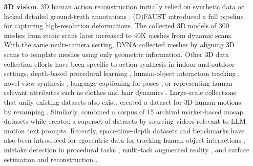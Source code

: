 \noindent
\textbf{3D vision}. 3D human action reconstruction initially relied on synthetic data  or lacked detailed ground-truth annotations . (D)FAUST  introduced a full pipeline for capturing high-resolution deformations. The collected 3D models of 300 meshes from static scans later increased to 40K meshes from dynamic scans. With the same multi-camera setting, DYNA  collected meshes by aligning 3D scans to template meshes using only geometric information. Other 3D data collection efforts have been specific to action synthesis in indoor  and outdoor  settings, depth-based procedural learning , human-object interaction tracking , novel view synthesis , language captioning for poses , or representing human-relevant attributes such as clothes and hair dynamics . Large-scale collections that unify existing datasets also exist.  created a dataset for 3D human motions by revamping . Similarly,   combined a corpus of 15 archival marker-based mocap datasets while  created a superset of datasets by sourcing videos  relevant to LLM motion text prompts. Recently, space-time-depth datasets and benchmarks have also been introduced for egocentric data for tracking human-object interactions , mistake detection in procedural tasks , multi-task augmented reality , and surface estimation and reconstruction .

